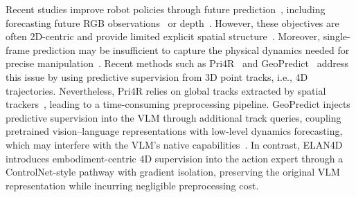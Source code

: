 Recent studies improve robot policies through future prediction~\citep{hafnerdream, cen2025worldvla, xu2026futurevlajointvisuomotorprediction, jiang2025rynnvla001usinghumandemonstrations, fan2026futurevlaforecastingunifiedtrajectories, hafner2022deep, qian2026escapeepisodicspatialmemory}, including forecasting future RGB observations~\citep{wu2024unleashing, cen2025worldvla} or depth~\citep{zhangdreamvla}. However, these objectives are often 2D-centric and provide limited explicit spatial structure~\citep{cen2025worldvla}. Moreover, single-frame prediction may be insufficient to capture the physical dynamics needed for precise manipulation~\citep{du2023learning, black2023zero}. Recent methods such as Pri4R~\citep{kim2026pri4rlearningworlddynamics} and GeoPredict~\citep{qian2025geopredict} address this issue by using predictive supervision from 3D point tracks, i.e., 4D trajectories. Nevertheless, Pri4R relies on global tracks extracted by spatial trackers~\citep{xiao2025spatialtracker}, leading to a time-consuming preprocessing pipeline. GeoPredict injects predictive supervision into the VLM through additional track queries, coupling pretrained vision--language representations with low-level dynamics forecasting, which may interfere with the VLM's native capabilities~\citep{zhang2026vlmvla, driess2025knowledgeinsulatingvisionlanguageactionmodels}. In contrast, ELAN4D introduces embodiment-centric 4D supervision into the action expert through a ControlNet-style pathway with gradient isolation, preserving the original VLM representation while incurring negligible preprocessing cost.
\vspace{-1em}